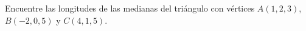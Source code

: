 \item Encuentre las longitudes de las medianas del triángulo con vértices $A(1, 2, 3)$, $B(-2, 0, 5)$ y $C(4, 1, 5)$.
